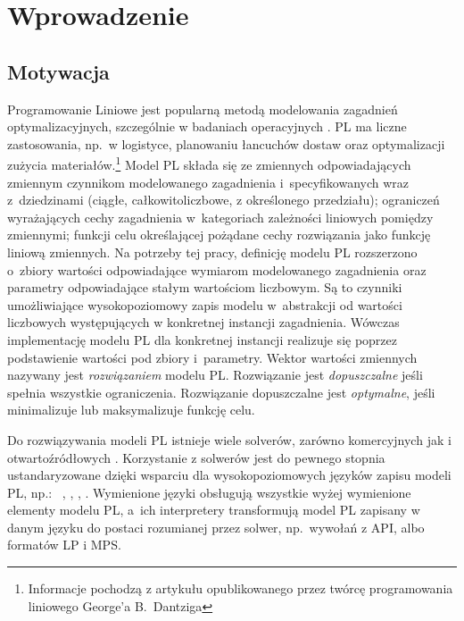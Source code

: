 
\chapter{Wprowadzenie}\label{ch:intro}

\section{Motywacja}\label{sec:intro:motivation}

Programowanie Liniowe  jest popularną metodą modelowania zagadnień optymalizacyjnych, szczególnie w badaniach operacyjnych \cite{williams2013model}. PL ma liczne zastosowania, np.~w logistyce, planowaniu łancuchów dostaw oraz optymalizacji zużycia materiałów.\footnote{Informacje pochodzą z artykułu opublikowanego przez twórcę programowania liniowego George'a B.~Dantziga\cite{dantzig2002linear}} %
Model PL składa się ze zmiennych odpowiadających zmiennym czynnikom modelowanego zagadnienia i~specyfikowanych wraz z~dziedzinami (ciągłe, całkowitoliczbowe, z określonego przedziału); ograniczeń wyrażających cechy zagadnienia w~kategoriach zależności liniowych pomiędzy zmiennymi; funkcji celu określającej pożądane cechy rozwiązania jako funkcję liniową zmiennych. Na potrzeby tej pracy, definicję modelu PL rozszerzono o~zbiory wartości odpowiadające wymiarom modelowanego zagadnienia oraz parametry odpowiadające stałym wartościom liczbowym. Są to czynniki umożliwiające wysokopoziomowy zapis modelu w~abstrakcji od wartości liczbowych występujących w konkretnej instancji zagadnienia. Wówczas implementację modelu PL dla konkretnej instancji realizuje się poprzez podstawienie wartości pod zbiory i~parametry.
Wektor wartości zmiennych nazywany jest \emph{rozwiązaniem} modelu PL. Rozwiązanie jest \emph{dopuszczalne} jeśli spełnia wszystkie ograniczenia. Rozwiązanie dopuszczalne jest \emph{optymalne}, jeśli minimalizuje lub maksymalizuje funkcję celu.

Do rozwiązywania modeli PL istnieje wiele solverów, zarówno komercyjnych \cite{TODO:przyklady} jak i otwartoźródłowych \cite{TODO:przyklady}. %
Korzystanie z solwerów jest do pewnego stopnia ustandaryzowane dzięki wsparciu dla wysokopoziomowych języków zapisu modeli PL, np.:~ \cite{TODO},  \cite{TODO},  \cite{TODO},  \cite{TODO}. Wymienione języki obsługują wszystkie wyżej wymienione elementy modelu PL, a~ich interpretery transformują model PL zapisany w danym języku do postaci rozumianej przez solwer, np.~wywołań z API, albo formatów LP i MPS.

